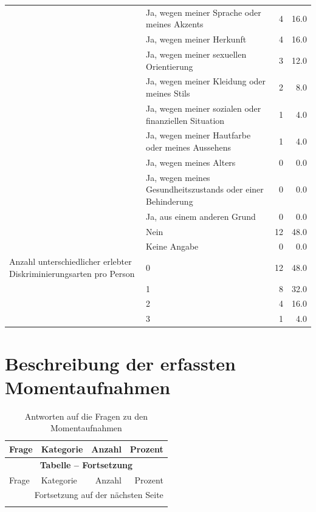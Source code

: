 \begin{appendices}
\begin{longtable}{p{5.5cm}p{5.5cm}rr}
     & Ja, wegen meiner Sprache oder meines Akzents & 4 & 16.0 \\*
     & Ja, wegen meiner Herkunft & 4 & 16.0 \\*
     & Ja, wegen meiner sexuellen Orientierung & 3 & 12.0 \\*
     & Ja, wegen meiner Kleidung oder meines Stils & 2 & 8.0 \\*
     & Ja, wegen meiner sozialen oder finanziellen Situation & 1 & 4.0 \\*
     & Ja, wegen meiner Hautfarbe oder meines Aussehens & 1 & 4.0 \\*
     & Ja, wegen meines Alters & 0 & 0.0 \\*
     & Ja, wegen meines Gesundheitszustands oder einer Behinderung & 0 & 0.0 \\*
     & Ja, aus einem anderen Grund & 0 & 0.0 \\*
     & Nein & 12 & 48.0 \\*
     & Keine Angabe & 0 & 0.0 \\
     \midrule
    \addlinespace
    Anzahl unterschiedlicher erlebter Diskriminierungsarten pro Person & 0 & 12 & 48.0 \\*
     & 1 & 8 & 32.0 \\*
     & 2 & 4 & 16.0 \\*
     & 3 & 1 & 4.0 \\
     \bottomrule
\end{longtable}
\normalsize


\clearpage
\section{Beschreibung der erfassten Momentaufnahmen}
\label{app:appendix_moments}

\footnotesize
\begin{longtable}{p{5.5cm}p{5.5cm}rr}
    \caption{Antworten auf die Fragen zu den Momentaufnahmen}
    \label{tab:moments}\\
    \toprule
    Frage & Kategorie & Anzahl & Prozent \\
    \midrule
    \endfirsthead

    \multicolumn{4}{c}{{\bfseries Tabelle \thetable{} -- Fortsetzung}} \\
    \toprule
    Frage & Kategorie & Anzahl & Prozent \\
    \midrule
    \endhead
    
    \midrule
    \multicolumn{4}{r}{Fortsetzung auf der nächsten Seite}\\
    \endfoot
    

\end{longtable}
\end{appendices}
